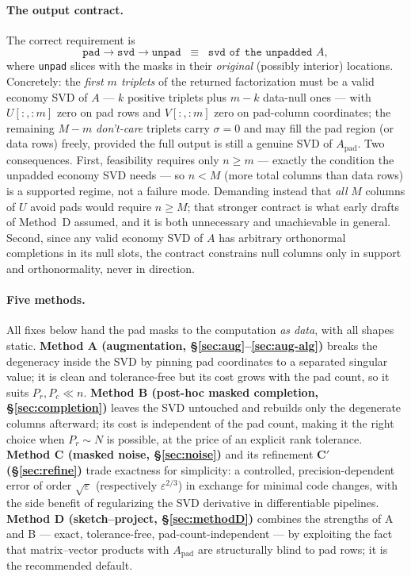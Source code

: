 \documentclass[11pt]{article}
\newcommand{\Apad}{A_{\mathrm{pad}}}
\begin{document}
\paragraph{The output contract.} The correct requirement is
\[
  \texttt{pad} \to \texttt{svd} \to \texttt{unpad}
  \;\;\equiv\;\;
  \texttt{svd of the unpadded } A,
\]
where \texttt{unpad} slices with the masks in their \emph{original} (possibly
interior) locations. Concretely: the \emph{first $m$ triplets} of the returned
factorization must be a valid economy SVD of $A$ --- $k$ positive triplets
plus $m-k$ data-null ones --- with $U[:, :m]$ zero on pad rows and
$V[:, :m]$ zero on pad-column coordinates; the remaining $M - m$
\emph{don't-care} triplets carry $\sigma = 0$ and may fill the pad region (or
data rows) freely, provided the full output is still a genuine SVD of
$\Apad$. Two consequences. First, feasibility requires only $n \ge m$ ---
exactly the condition the unpadded economy SVD needs --- so $n < M$ (more
total columns than data rows) is a supported regime, not a failure mode.
Demanding instead that \emph{all} $M$ columns of $U$ avoid pads would require
$n \ge M$; that stronger contract is what early drafts of Method~D assumed,
and it is both unnecessary and unachievable in general. Second, since any
valid economy SVD of $A$ has arbitrary orthonormal completions in its null
slots, the contract constrains null columns only in support and orthonormality,
never in direction.

\paragraph{Five methods.} All fixes below hand the pad masks to the computation
\emph{as data}, with all shapes static. \textbf{Method A (augmentation,
\S\ref{sec:aug}--\ref{sec:aug-alg})} breaks the degeneracy inside the SVD by
pinning pad coordinates to a separated singular value; it is clean and
tolerance-free but its cost grows with the pad count, so it suits
$P_r, P_c \ll n$. \textbf{Method B (post-hoc masked completion,
\S\ref{sec:completion})} leaves the SVD untouched and rebuilds only the
degenerate columns afterward; its cost is independent of the pad count, making
it the right choice when $P_r \sim N$ is possible, at the price of an explicit
rank tolerance. \textbf{Method C (masked noise, \S\ref{sec:noise})} and its
refinement \textbf{C$'$ (\S\ref{sec:refine})} trade exactness for simplicity:
a controlled, precision-dependent error of order $\sqrt{\varepsilon}$
(respectively $\varepsilon^{2/3}$) in exchange for minimal code changes, with
the side benefit of regularizing the SVD derivative in differentiable
pipelines. \textbf{Method D (sketch--project, \S\ref{sec:methodD})} combines
the strengths of A and B --- exact, tolerance-free, pad-count-independent ---
by exploiting the fact that matrix--vector products with $\Apad$ are
structurally blind to pad rows; it is the recommended default.
\end{document}
